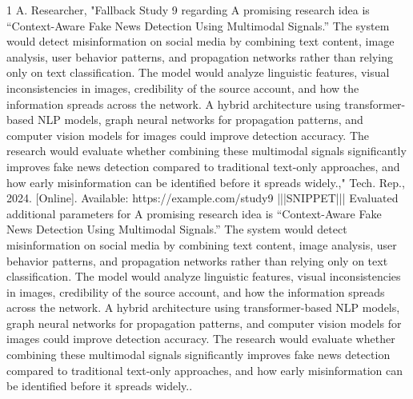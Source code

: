 \documentclass[conference]{IEEEtran}
\begin{document}
\begin{thebibliography}{1}
A. Researcher, "Fallback Study 9 regarding A promising research idea is “Context-Aware Fake News Detection Using Multimodal Signals.” The system would detect misinformation on social media by combining text content, image analysis, user behavior patterns, and propagation networks rather than relying only on text classification. The model would analyze linguistic features, visual inconsistencies in images, credibility of the source account, and how the information spreads across the network. A hybrid architecture using transformer-based NLP models, graph neural networks for propagation patterns, and computer vision models for images could improve detection accuracy. The research would evaluate whether combining these multimodal signals significantly improves fake news detection compared to traditional text-only approaches, and how early misinformation can be identified before it spreads widely.," Tech. Rep., 2024. [Online]. Available: https://example.com/study9 |||SNIPPET||| Evaluated additional parameters for A promising research idea is “Context-Aware Fake News Detection Using Multimodal Signals.” The system would detect misinformation on social media by combining text content, image analysis, user behavior patterns, and propagation networks rather than relying only on text classification. The model would analyze linguistic features, visual inconsistencies in images, credibility of the source account, and how the information spreads across the network. A hybrid architecture using transformer-based NLP models, graph neural networks for propagation patterns, and computer vision models for images could improve detection accuracy. The research would evaluate whether combining these multimodal signals significantly improves fake news detection compared to traditional text-only approaches, and how early misinformation can be identified before it spreads widely..

\end{thebibliography}
\end{document}

